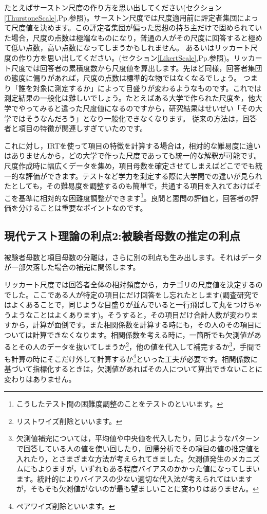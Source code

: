 \documentclass{ltjsbook}
\begin{document}
たとえばサーストン尺度の作り方を思い出してください(セクション\ref{ThurstoneScale},Pp.\pageref{ThurstoneScale}参照)。サーストン尺度では尺度適用前に評定者集団によって尺度値を決めます。この評定者集団が偏った思想の持ち主だけで固められていた場合，尺度の点数は極端なものになり，普通の人がその尺度に回答すると極めて低い点数，高い点数になってしまうかもしれません。
あるいはリッカート尺度の作り方を思い出してください。(セクション\ref{LikertScale},Pp.\pageref{LikertScale}参照)。リッカート尺度では回答者の累積度数から尺度値を算出します。先ほど同様，回答者集団の態度に偏りがあれば，尺度の点数は標準的な物ではなくなるでしょう。
つまり「誰を対象に測定するか」によって目盛りが変わるようなものです。これでは測定結果の一般化は難しいでしょう。たとえばある大学で作られた尺度を，他大学でやってみると違った尺度値になるのですから，研究結果はせいぜい「その大学ではそうなんだろう」となり一般化できなくなります。
従来の方法は，回答者と項目の特徴が関連しすぎていたのです。

これに対し，IRTを使って項目の特徴を計算する場合は，相対的な難易度に違いはありませんから，どの大学で作った尺度であっても統一的な解釈が可能です。尺度作成時に幅広くデータを集め，項目母数を確定させてしまえばどこででも統一的な評価ができます。テストなど学力を測定する際に大学間での違いが見られたとしても，その難易度を調整するのも簡単で，共通する項目を入れておけばそこを基準に相対的な困難度調整ができます\footnote{こうしたテスト間の困難度調整のことをテストのといいます。}。良問と悪問の評価と，回答者の評価を分けることは重要なポイントなのです。
\subsection{現代テスト理論の利点2:被験者母数の推定の利点}
被験者母数と項目母数の分離は，さらに別の利点も生み出します。それはデータが一部欠落した場合の補完に関係します。

リッカート尺度では回答者全体の相対頻度から，カテゴリの尺度値を決定するのでした。ここである人が特定の項目にだけ回答をし忘れたとします(調査研究ではよくあることで，同じような目盛りが並んでいると一行飛ばして丸をつけちゃうようなことはよくあります)。そうすると，その項目だけ合計人数が変わりますから，計算が面倒です。また相関係数を計算する時にも，その人のその項目については計算できなくなります。相関係数を考える時に，一箇所でも欠測値があるとその人のデータを抜いてしまうか\footnote{リストワイズ削除といいます。}，他の値を代入して補完するか\footnote{欠測値補完については，平均値や中央値を代入したり，同じようなパターンで回答している人の値を使い回したり，回帰分析でその項目の値の推定値を入れたり，とさまざまな方法が考えられてきました。欠測値発生のメカニズムにもよりますが，いずれもある程度バイアスのかかった値になってしまいます。統計的によりバイアスの少ない適切な代入法が考えられてはいますが，そもそも欠測値がないのが最も望ましいことに変わりはありません。}，手間でも計算の時にそこだけ外して計算するか\footnote{ペアワイズ削除といいます。}といった工夫が必要です。相関係数に基づいて指標化するときは，欠測値があればその人について算出できないことに変わりはありません。
\end{document}
